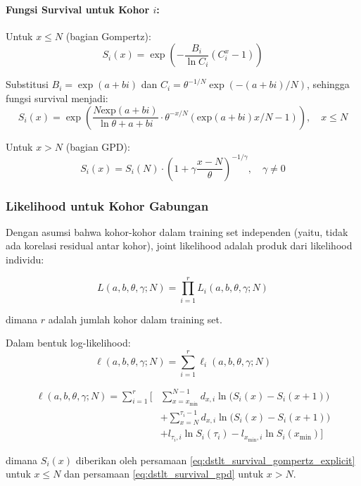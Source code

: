 \paragraph{Fungsi Survival untuk Kohor $i$:}

Untuk $x \leq N$ (bagian Gompertz):
\begin{equation}
S_i(x) = \exp\left(-\frac{B_i}{\ln C_i}(C_i^x - 1)\right)
\label{eq:dstlt_survival_gompertz}
\end{equation}

Substitusi $B_i = \exp(a + bi)$ dan $C_i = \theta^{-1/N} \exp(-(a+bi)/N)$, sehingga fungsi survival menjadi:
\begin{equation}
S_i(x) = \exp\left(\frac{N \text{exp}(a+bi)}{\ln\theta +a+bi} \cdot \theta^{-x/N}(\text{exp}(a+bi) x/N - 1)\right), \quad x \leq N
\label{eq:dstlt_survival_gompertz_explicit}
\end{equation}

Untuk $x > N$ (bagian GPD):
\begin{equation}
S_i(x) = S_i(N) \cdot \left(1 + \gamma\frac{x-N}{\theta}\right)^{-1/\gamma}, \quad \gamma \neq 0
\label{eq:dstlt_survival_gpd}
\end{equation}

\subsubsection{Likelihood untuk Kohor Gabungan}

Dengan asumsi bahwa kohor-kohor dalam training set independen (yaitu, tidak ada korelasi residual antar kohor), joint likelihood adalah produk dari likelihood individu:

\begin{equation}
L(a, b, \theta, \gamma; N) = \prod_{i=1}^{r} L_i(a, b, \theta, \gamma; N)
\label{eq:dstlt_joint_likelihood}
\end{equation}

dimana $r$ adalah jumlah kohor dalam training set.

Dalam bentuk log-likelihood:
\begin{equation}
\ell(a, b, \theta, \gamma; N) = \sum_{i=1}^{r} \ell_i(a, b, \theta, \gamma; N)
\label{eq:dstlt_joint_loglikelihood}
\end{equation}

\begin{align}
\ell(a, b, \theta, \gamma; N) = \sum_{i=1}^{r} \Bigg[ &\sum_{x=x_{\min}}^{N-1} d_{x,i} \ln\big(S_i(x) - S_i(x+1)\big) \nonumber \\
&+ \sum_{x=N}^{\tau_i-1} d_{x,i} \ln\big(S_i(x) - S_i(x+1)\big) \nonumber \\
&+ l_{\tau_i,i} \ln S_i(\tau_i) - l_{x_{\min},i} \ln S_i(x_{\min}) \Bigg]
\label{eq:dstlt_loglik_expanded}
\end{align}

dimana $S_i(x)$ diberikan oleh persamaan \eqref{eq:dstlt_survival_gompertz_explicit} untuk $x \leq N$ dan persamaan \eqref{eq:dstlt_survival_gpd} untuk $x > N$.

